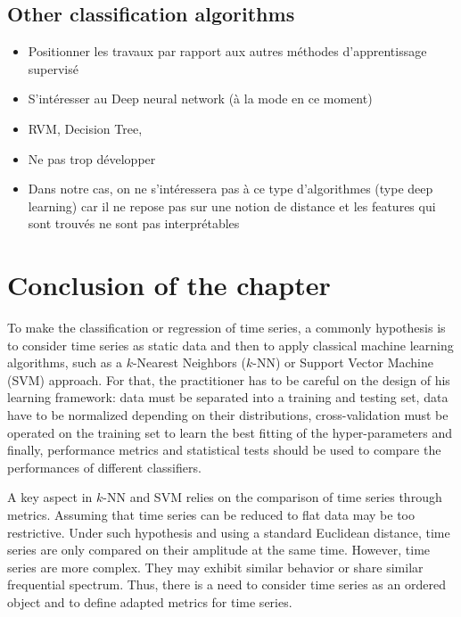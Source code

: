 \subsection{Other classification algorithms}
\begin{itemize}
	\item Positionner les travaux par rapport aux autres méthodes d'apprentissage supervisé
	\item S'intéresser au Deep neural network (à la mode en ce moment)
	\item RVM, Decision Tree, 
	\item Ne pas trop développer
	\item Dans notre cas, on ne s'intéressera pas à ce type d'algorithmes (type deep learning) car il ne repose pas sur une notion de distance et les features qui sont trouvés ne sont pas interprétables
\end{itemize}



\section{Conclusion of the chapter}

To make the classification or regression of time series, a commonly hypothesis is to consider time series as static data and then to apply classical machine learning algorithms, such as a $k$-Nearest Neighbors ($k$-NN) or Support Vector Machine (SVM) approach. For that, the practitioner has to be careful on the design of his learning framework: data must be separated into a training and testing set, data have to be normalized depending on their distributions, cross-validation must be operated on the training set to learn the best fitting of the hyper-parameters and finally, performance metrics and statistical tests should be used to compare the performances of different classifiers.

A key aspect in $k$-NN and SVM relies on the comparison of time series through metrics. Assuming that time series can be reduced to flat data may be too restrictive. Under such hypothesis and using a standard Euclidean distance, time series are only compared on their amplitude at the same time. However, time series are more complex. They may exhibit similar behavior or share similar frequential spectrum. Thus, there is a need to consider time series as an ordered object and to define adapted metrics for time series.


